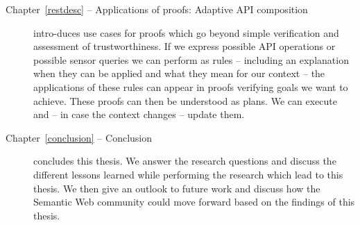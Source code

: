 \begin{description}
\item[Chapter~\ref{restdesc} -- Applications of proofs: Adaptive API composition]
intro-\linebreak duces use cases for proofs which go 
beyond simple verification and assessment of trustworthiness.
If we express possible API operations or possible sensor queries we can perform as rules -- including an explanation when they can be applied and what they mean 
for our context -- the applications of these rules can appear in proofs verifying goals we want to achieve. These proofs can then be understood as plans. 
We can execute and -- in case the context changes -- update them. 
% 
% 


\item[Chapter~\ref{conclusion} -- Conclusion]
concludes this thesis.  We answer the research questions and discuss the different lessons learned while performing the research which  lead to this thesis.
We then give an outlook to future work and discuss how the Semantic Web community could move forward based on the findings of this thesis.
% 



\end{description}
